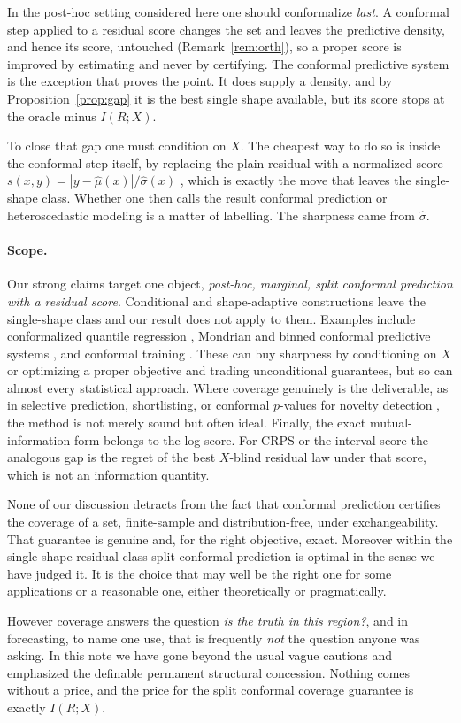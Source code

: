\documentclass[11pt]{article}
\theoremstyle{definition}
\begin{document}
In the post-hoc setting considered here one should conformalize \emph{last}.
A conformal step applied to a residual score changes the set and leaves the predictive
density, and hence its score, untouched (Remark~\ref{rem:orth}), so a proper score is
improved by estimating and never by certifying. The conformal predictive system is the
exception that proves the point. It does supply a density, and by
Proposition~\ref{prop:gap} it is the best single shape available, but its score stops at the
oracle minus $I(R;X)$.

To close that gap one must condition on $X$. The cheapest way to do so is inside the
conformal step itself, by replacing the plain residual with a normalized score
$s(x,y)=|y-\hat\mu(x)|/\hat\sigma(x)$ \citep{lei2018distribution}, which is exactly the move
that leaves the single-shape class. Whether one then calls the result conformal prediction
or heteroscedastic modeling is a matter of labelling. The sharpness came from $\hat\sigma$.

\paragraph{Scope.} Our strong claims target one object, \emph{post-hoc, marginal, split
conformal prediction with a residual score}. Conditional and shape-adaptive constructions
leave the single-shape class and our result does not apply to them. Examples include
conformalized quantile regression \citep{romano2019conformalized}, Mondrian and binned
conformal predictive systems \citep{bostrom2021mondrian,toccaceli2026crps}, and conformal
training \citep{stutz2022learning}. These can buy sharpness by conditioning on $X$ or
optimizing a proper objective and trading unconditional guarantees, but so can almost every
statistical approach. Where coverage genuinely is the deliverable, as in selective
prediction, shortlisting, or conformal $p$-values for novelty detection
\citep{angelopoulos2021uncertainty,bates2021distribution}, the method is not merely sound
but often ideal. Finally, the exact mutual-information form belongs to the log-score. For
CRPS or the interval score the analogous gap is the regret of the best $X$-blind residual
law under that score, which is not an information quantity.


None of our discussion detracts from the fact that conformal prediction certifies the coverage
 of a set, finite-sample and distribution-free,
under exchangeability. That guarantee is genuine and, for the right objective, exact. Moreover within
the single-shape residual class split conformal prediction is optimal in the sense we have judged it. It
is the choice that may well be the right one for some applications or a reasonable one, either theoretically or pragmatically.  

However coverage answers the question \emph{is
the truth in this region?}, and in forecasting, to name one use, that is frequently {\em not} the question anyone was
asking.  In this note we have gone beyond the usual vague cautions and emphasized
the definable permanent structural concession. Nothing comes without a price, and 
the price for the split conformal coverage guarantee is exactly $I(R;X)$. 



\end{document}
